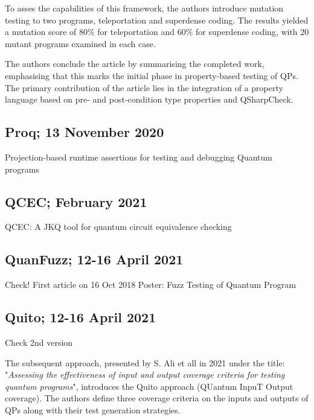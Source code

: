 \begin{itemize}
To asses the capabilities of this framework, the authors introduce mutation testing to two programs, teleportation and superdense coding. The results yielded a mutation score of $80\%$ for teleportation and $60\%$ for superdense coding, with 20 mutant programs examined in each case.\newline

The authors conclude the article by summarising the completed work, emphasising that this marks the initial phase in property-based testing of QPs. The primary contribution of the article lies in the integration of a property language based on pre- and post-condition type properties and QSharpCheck.

\vspace{15pt}
\subsection{Proq; 13 November 2020}

Projection-based runtime assertions for testing and debugging Quantum programs \cite{li2020projection}

\vspace{15pt}
\subsection{QCEC; February 2021}

QCEC: A JKQ tool for quantum circuit equivalence checking 

\vspace{15pt}
\subsection{QuanFuzz; 12-16 April 2021}

Check! First article on 16 Oct 2018 \cite{wang2018quanfuzz}
Poster: Fuzz Testing of Quantum Program 
 \cite{wang2021poster}

\vspace{15pt}
\subsection{Quito; 12-16 April 2021}
\label{Ch3.2.2:Quito}

Check 2nd version \cite{wang2021quito}

 The subsequent approach, presented by S. Ali et all in 2021 under the title: "\textit{Assessing the effectiveness of input and output coverage criteria for testing quantum programs}"\cite{ali2021assessing}, introduces the Quito approach (QUantum InpuT Output coverage). The authors define three coverage criteria on the inputs and outputs of QPs along with their test generation strategies.\newline


\end{itemize}
